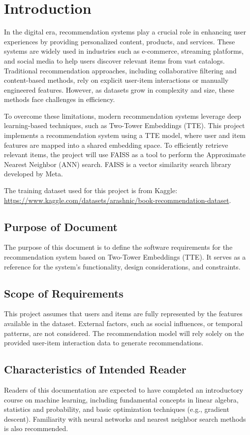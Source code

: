 \documentclass[12pt]{article}
\begin{document}
\section{Introduction}
In the digital era, recommendation systems play a crucial role in enhancing user experiences by providing personalized content, products, and services. These systems are widely used in industries such as e-commerce, streaming platforms, and social media to help users discover relevant items from vast catalogs. Traditional recommendation approaches, including collaborative filtering and content-based methods, rely on explicit user-item interactions or manually engineered features. However, as datasets grow in complexity and size, these methods face challenges in efficiency.

To overcome these limitations, modern recommendation systems leverage deep learning-based techniques, such as Two-Tower Embeddings (TTE). This project implements a recommendation system using a TTE model, where user and item features are mapped into a shared embedding space. To efficiently retrieve relevant items, the project will use FAISS as a tool to perform the Approximate Nearest Neighbor (ANN) search. FAISS is a vector similarity search library developed by Meta.

The training dataset used for this project is from Kaggle: \url{https://www.kaggle.com/datasets/arashnic/book-recommendation-dataset}.

\subsection{Purpose of Document}

The purpose of this document is to define the software requirements for the recommendation system based on Two-Tower Embeddings (TTE). It serves as a reference for the system’s functionality, design considerations, and constraints.

\subsection{Scope of Requirements} 

This project assumes that users and items are fully represented by the features available in the dataset. External factors, such as social influences, or temporal patterns, are not considered. The recommendation model will rely solely on the provided user-item interaction data to generate recommendations.

\subsection{Characteristics of Intended Reader} \label{sec_IntendedReader}
Readers of this documentation are expected to have completed an introductory course on machine learning, including fundamental concepts in linear algebra, statistics and probability, and basic optimization techniques (e.g., gradient descent). Familiarity with neural networks and nearest neighbor search methods is also recommended.
\end{document}
